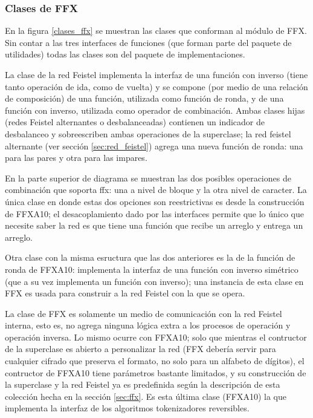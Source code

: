 %
%
%

\subsubsection{Clases de FFX}

En la figura \ref{clases_ffx} se muestran las clases que conforman al módulo de
FFX. Sin contar a las tres interfaces de funciones (que forman parte del paquete
de utilidades) todas las clases son del paquete de implementaciones.

La clase de la red Feistel implementa la interfaz de una función con inverso
(tiene tanto operación de ida, como de vuelta) y se compone (por medio de una
relación de composición) de una función, utilizada como función de ronda, y de
una función con inverso, utilizada como operador de combinación. Ambas clases
hijas (redes Feistel alternantes o desbalanceadas) contienen un indicador de
desbalanceo y sobreescriben ambas operaciones de la superclase; la red feistel
alternante (ver sección \ref{sec:red_feistel}) agrega una nueva función
de ronda: una para las pares y otra para las impares.

En la parte superior de diagrama se muestran las dos posibles operaciones de
combinación que soporta ffx: una a nivel de bloque y la otra nivel de caracter.
La única clase en donde estas dos opciones son reestrictivas es desde la
construcción de FFXA10; el desacoplamiento dado por las interfaces permite que
lo único que necesite saber la red es que tiene una función que recibe un
arreglo y entrega un arreglo.

Otra clase con la misma esructura que las dos anteriores es la de la función de
ronda de FFXA10: implementa la interfaz de una función con inverso simétrico
(que a su vez implementa un función con inverso); una instancia de esta clase
en FFX es usada para construir a la red Feistel con la que se opera.

La clase de FFX es solamente un medio de comunicación con la red Feistel
interna, esto es, no agrega ninguna lógica extra a los procesos de operación y
operación inversa. Lo mismo ocurre con FFXA10; solo que mientras el contructor
de la superclase es abierto a personalizar la red (FFX debería servir para
cualquier cifrado que preserva el formato, no solo para un alfabeto de
dígitos), el contructor de FFXA10 tiene parámetros bastante limitados, y su
construcción de la superclase y la red Feistel ya es predefinida según la
descripción de esta colección hecha en la sección \ref{sec:ffx}. Es esta última
clase (FFXA10) la que implementa la interfaz de los algoritmos tokenizadores
reversibles.


